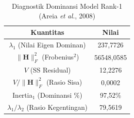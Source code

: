 \begin{table}[H]
\centering
\small
\caption{Diagnostik Dominansi Model Rank-1 (Areia \textit{et al.}, 2008)} \label{tab:struktur_diagnostik}
\begin{tabular}{|c|c|}
\hline
\textbf{Kuantitas} & \textbf{Nilai} \\
\hline
$\lambda_1$ (Nilai Eigen Dominan) & 237,7726 \\
$\|\mathbf{H}\|_F^2$ (Frobenius$^2$) & 56548,0585 \\
$V$ (SS Residual) & 12,2276 \\
$V / \|\mathbf{H}\|_F^2$ (Rasio Sisa) & 0,0002 \\
Inertia$_1$ (Dominansi \%) & 97,52\% \\
$\lambda_1 / \lambda_2$ (Rasio Kegentingan) & 79,5619 \\
\hline
\end{tabular}
\end{table}